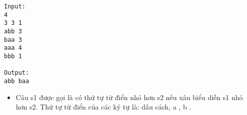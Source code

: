 \begin{verbatim}
Input:
4
3 3 1
abb 3
baa 3
aaa 4
bbb 1

Output:
abb baa
\end{verbatim}
\begin{itemize}
	\item Câu s1 được gọi là có thứ tự từ điển nhỏ hơn s2 nếu xâu biểu diễn s1 nhỏ hơn s2. Thứ tự từ điển của các ký tự là: dấu cách, a , b .
\end{itemize}